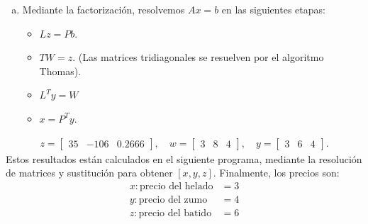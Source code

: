 \begin{frame}
	\begin{enumerate}[b)]
		\item

		      Mediante la factorización, resolvemos $Ax=b$ en las siguientes etapas:

		      \begin{itemize}
			      \item

			            \begin{math}
				            Lz=
				            Pb
			            \end{math}.
			      \item

			            \begin{math}
				            TW=
				            z
			            \end{math}.
			            (Las matrices tridiagonales se resuelven por el algoritmo Thomas).
			      \item

			            \begin{math}
				            L^{T}y=
				            W
			            \end{math}

			      \item

			            \begin{math}
				            x=
				            P^{T}y
			            \end{math}.
		      \end{itemize}
	\end{enumerate}

	\begin{align*}
		z=
		\begin{bmatrix}
			35 & -106 & 0.2666
		\end{bmatrix},\quad
		w=
		\begin{bmatrix}
			3 & 8 & 4
		\end{bmatrix},\quad
		y=\begin{bmatrix}
			  3 & 6 & 4
		  \end{bmatrix}.
	\end{align*}
	Estos resultados están calculados en el siguiente programa, mediante
	la resolución de matrices y sustitución para obtener $\left[x,y,z\right]$.
	Finalmente, los precios son:
	\begin{align*}
		x:\text{precio del helado} & = 3 \\
		y:\text{precio del zumo}   & = 4 \\
		z:\text{precio del batido} & = 6
	\end{align*}
\end{frame}

